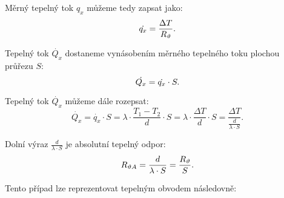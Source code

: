 \documentclass{article}
\begin{document}
Měrný tepelný tok $q_x$ můžeme tedy zapsat jako:
\begin{equation}
    \dot{q_x} = \frac{\Delta T}{R_{\vartheta}}.
    \unit{(\ueqWandMinvsq)}
\end{equation}

Tepelný tok $\dot{Q_x}$ dostaneme vynásobením měrného tepelného toku plochou průřezu $S$:
\begin{equation}
    \dot{Q_x} = \dot{q_x} \cdot S.
    \unit{(\ueqW)}
\end{equation}

Tepelný tok $\dot{Q_x}$ můžeme dále rozepsat:
$$
    \dot{Q_x} = \dot{q_x} \cdot S = \lambda \cdot \frac{T_1 - T_2}{d} \cdot S = \lambda \cdot \frac{\Delta T}{d} \cdot S = \frac{\Delta T}{\frac{d}{\lambda \cdot S}}.
$$

Dolní výraz $\frac{d}{\lambda \cdot S}$ je absolutní tepelný odpor:
\begin{equation}
    R_{\vartheta A} = \frac{d}{\lambda \cdot S} = \frac{R_{\vartheta}}{S}.
    \unit{(\ueqKandWinv)}
\end{equation}

Tento případ lze reprezentovat tepelným obvodem následovně:
\begin{center}
\end{center}
\end{document}

